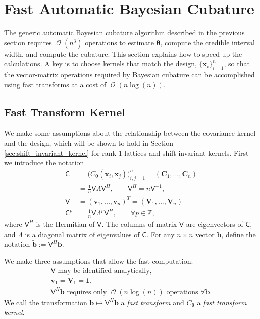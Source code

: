 \documentclass[twocolumn]{svjour3}          %
\DeclareMathOperator{\Order}{{\mathcal O}}
\newcommand{\bm}[1]{\boldsymbol{#1}}
\newcommand{\integers}{\mathbb{Z}}
\newcommand{\vtheta}{{\bm{\theta}}}
\newcommand{\vb}{\bm{b}}
\newcommand{\vC}{\bm{C}}
\newcommand{\vv}{\bm{v}}
\newcommand{\vV}{\bm{V}}
\newcommand{\vx}{\bm{x}}
\newcommand{\vone}{\bm{1}}
\newcommand{\mC}{\mathsf{C}}
\newcommand{\mLambda}{\mathsf{\Lambda}}
\newcommand{\mV}{\mathsf{V}}
\begin{document}
\section{Fast Automatic Bayesian Cubature}\label{sec:fast_BC}

The generic automatic Bayesian cubature algorithm described in the previous section requires $\Order(n^3)$ operations to estimate $\vtheta$, compute the credible interval width, and compute the cubature.  This section explains how to speed up the calculations. A key is to choose kernels that match the design, $\{\vx_i\}_{i=1}^n$, so that the vector-matrix operations required by Bayesian cubature can be accomplished using fast transforms at a cost of $\Order(n \log(n))$.

\subsection{Fast Transform Kernel}
We make some assumptions about the relationship between the covariance kernel and the design, which will be shown to hold in Section \ref{sec:shift_invariant_kernel} for rank-1 lattices and shift-invariant kernels.  First we introduce the notation
\begin{align}
\nonumber
\mC &= \Big(C_\vtheta(\vx_i,\vx_j)\Big)_{i,j=1}^n  = (\vC_1,...,\vC_n) 
\\
\label{eqn:ftk_factor}
&= \frac 1n \mV \mLambda \mV^H , 
\quad \quad \mV^H = n \mV^{-1}, \\
\nonumber
\mV &= (\vv_1,...,\vv_n)^T = (\vV_1,...,\vV_n) \\
\nonumber
\mC^p  &= \frac 1n \mV \mLambda^{p} \mV^H, \qquad \forall p \in \integers,
\end{align}
where $\mV^H$ is the Hermitian of $\mV$.  The columns of matrix $\mV$ are eigenvectors of $\mC$, and $\mLambda$ is a diagonal matrix of eigenvalues of $\mC$.
For any $n \times n$ vector $\vb$, define the notation  $\widetilde{\vb} := \mV^H \vb$.

We make three assumptions that allow the fast computation:
\begin{subequations} \label{fastcompAssump}
	\begin{gather}
	\label{fastcompAssumpA}
	\mV \text{ may be identified analytically}, \\
	\label{fastcompAssumpB}
	\vv_1 = \vV_1 = \vone, \\
	\label{fastcompAssumpC}
	\mV^H \vb  \text{ requires only $\Order(n \log(n))$ operations } \forall \vb.
	\end{gather}
\end{subequations}
We call the transformation $\vb \mapsto \mV^H \vb$ a \emph{fast transform} and $C_\vtheta$ a \emph{fast transform kernel}.  
\end{document}
